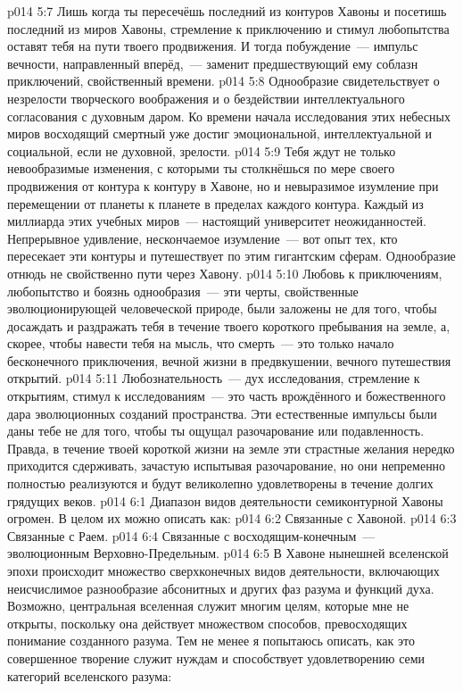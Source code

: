 \vs p014 5:7 Лишь когда ты пересечёшь последний из контуров Хавоны и посетишь последний из миров Хавоны, стремление к приключению и стимул любопытства оставят тебя на пути твоего продвижения. И тогда побуждение~--- импульс вечности, направленный вперёд,~--- заменит предшествующий ему соблазн приключений, свойственный времени.
\vs p014 5:8 Однообразие свидетельствует о незрелости творческого воображения и о бездействии интеллектуального согласования с духовным даром. Ко времени начала исследования этих небесных миров восходящий смертный уже достиг эмоциональной, интеллектуальной и социальной, если не духовной, зрелости.
\vs p014 5:9 Тебя ждут не только невообразимые изменения, с которыми ты столкнёшься по мере своего продвижения от контура к контуру в Хавоне, но и невыразимое изумление при перемещении от планеты к планете в пределах каждого контура. Каждый из миллиарда этих учебных миров~--- настоящий университет неожиданностей. Непрерывное удивление, нескончаемое изумление~--- вот опыт тех, кто пересекает эти контуры и путешествует по этим гигантским сферам. Однообразие отнюдь не свойственно пути через Хавону.
\vs p014 5:10 Любовь к приключениям, любопытство и боязнь однообразия~--- эти черты, свойственные эволюционирующей человеческой природе, были заложены не для того, чтобы досаждать и раздражать тебя в течение твоего короткого пребывания на земле, а, скорее, чтобы навести тебя на мысль, что смерть~--- это только начало бесконечного приключения, вечной жизни в предвкушении, вечного путешествия открытий.
\vs p014 5:11 Любознательность~--- дух исследования, стремление к открытиям, стимул к исследованиям~--- это часть врождённого и божественного дара эволюционных созданий пространства. Эти естественные импульсы были даны тебе не для того, чтобы ты ощущал разочарование или подавленность. Правда, в течение твоей короткой жизни на земле эти страстные желания нередко приходится сдерживать, зачастую испытывая разочарование, но они непременно полностью реализуются и будут великолепно удовлетворены в течение долгих грядущих веков.
\vs p014 6:1 Диапазон видов деятельности семиконтурной Хавоны огромен. В целом их можно описать как:
\vs p014 6:2 Связанные с Хавоной.
\vs p014 6:3 Связанные с Раем.
\vs p014 6:4 Связанные с восходящим\hyp{}конечным~--- эволюционным Верховно\hyp{}Предельным.
\vs p014 6:5 \pc В Хавоне нынешней вселенской эпохи происходит множество сверхконечных видов деятельности, включающих неисчислимое разнообразие абсонитных и других фаз разума и функций духа. Возможно, центральная вселенная служит многим целям, которые мне не открыты, поскольку она действует множеством способов, превосходящих понимание созданного разума. Тем не менее я попытаюсь описать, как это совершенное творение служит нуждам и способствует удовлетворению семи категорий вселенского разума:
